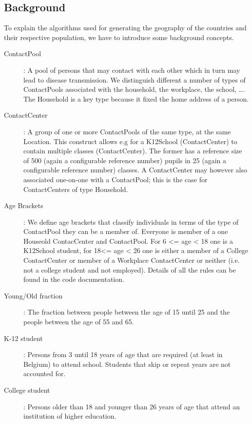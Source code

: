 \subsection{Background}
\label{subsection:background}

To explain the algorithms used for generating the geography of the countries and their respective population, we have to introduce some background concepts. 

\begin{description}
    \item[ContactPool]:
        A pool of persons that may contact with each other which in turn may lead to disease transmission.
        We distinguish different a number of types of ContactPools associated with the household, the workplace, 
        the school, \ldots. The Household is a key type because it fixed the home address of a person.
    \item[ContactCenter]:
        A group of one or more ContactPools of the same type, at the same Location.
        This construct allows e.g for a K12School (ContactCenter) to contain multiple classes (ContactCenter). 
        The former has a reference size of 500 (again a configurable reference number) pupils in 25 
        (again a configurable reference number) classes.
        A ContactCenter may however also associated one-on-one with a ContactPool; this is the case for 
        ContactCenters of type  Household.
\item[Age Brackets]: 
    		We define age brackets that classify individuals in terms of the type of ContactPool they 
    		can be a member of. Everyone is member of a one Houseold ContacCenter and ContactPool. 
    		For  6 <= age < 18 one is a K12School student, for 18<= age < 26 one is either a member of a College
    		ContactCenter or member of a Workplace ContactCenter or neither (i.e. not a college student and not
    		employed). Details of all the rules can be found in the code documentation.
    \item[Young/Old fraction]:
        	The fraction between people between the age of 15 until 25 and the people between the age of 55 and 65.
    \item[K-12 student]:
    		Persons from 3 until 18 years of age that are required (at least in Belgium) to attend school.
    		Students that skip or repeat years are not accounted for.
    \item[College student]:
        Persons older than 18 and younger than 26 years of age that attend an institution of higher education.

\end{description}
